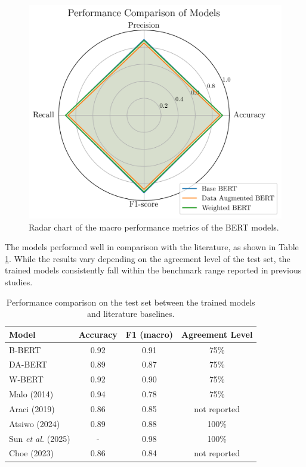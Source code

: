 \documentclass[conference]{IEEEtran}
\begin{document}
\begin{figure}[H]
    \centering
    \includegraphics[width=1\linewidth]{assets/results_radarchart.png}
    \caption{Radar chart of the macro performance metrics of the BERT models.}
    \label{fig:results_radarchart}
\end{figure}

The models performed well in comparison with the literature, as shown in Table \ref{results_table}. While the results vary depending on the agreement level of the test set, the trained models consistently fall within the benchmark range reported in previous studies.

\begin{table}[H]
\centering
\caption{Performance comparison on the test set between the trained models and literature baselines.}
\label{results_table}
\begin{tabular}{lccc}
\toprule
\textbf{Model} & \textbf{Accuracy} & \textbf{F1 (macro)} & \textbf{Agreement Level} \\
\midrule
B-BERT & 0.92 & 0.91 & 75\% \\
DA-BERT & 0.89 & 0.87 & 75\% \\
W-BERT & 0.92 & 0.90 & 75\% \\
\midrule
Malo (2014) & 0.94 & 0.78 & 75\% \\
Araci (2019) & 0.86 & 0.85 & not reported \\
Atsiwo (2024) & 0.89 & 0.88 & 100\% \\
Sun \textit{et al.} (2025) & - & 0.98 & 100\% \\
Choe (2023) & 0.86 & 0.84 & not reported \\
\bottomrule
\end{tabular}
\end{table}
\end{document}
